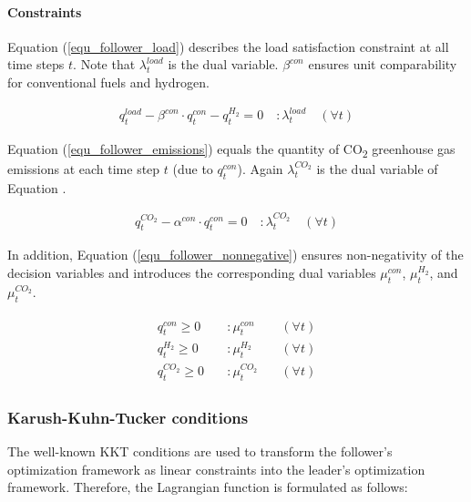 \documentclass[review]{elsarticle}
\begin{document}
\paragraph{Constraints} Equation (\ref{equ_follower_load}) describes the load satisfaction constraint at all time steps $t$. Note that $\lambda_{t}^{load}$ is the dual variable. $\beta^{con}$ ensures unit comparability for conventional fuels and hydrogen.

\begin{align}\label{equ_follower_load}
q_{t}^{load} - \beta^{con} \cdot q_{t}^{con} - q_{t}^{H_2} = 0 \quad :\lambda_{t}^{load} \quad (\forall t)
\end{align}

Equation (\ref{equ_follower_emissions}) equals the quantity of CO\textsubscript{2} greenhouse gas emissions at each time step $t$ (due to $q_{t}^{con}$). Again $\lambda_{t}^{CO_2}$ is the dual variable of Equation .

\begin{align}\label{equ_follower_emissions}
q_{t}^{CO_2} - \alpha^{con} \cdot q_{t}^{con} = 0 \quad :\lambda_{t}^{CO_2} \quad (\forall t)
\end{align}

In addition, Equation (\ref{equ_follower_nonnegative}) ensures non-negativity of the decision variables and introduces the corresponding dual variables $\mu_t^{con}$, $\mu_t^{H_2}$, and $\mu_t^{CO_2}$.

\begin{align}\label{equ_follower_nonnegative}
\begin{aligned}
q_{t}^{con} \geq 0 & \quad:\mu_t^{con} & \quad(\forall t)\\
q_{t}^{H_2} \geq 0 & \quad:\mu_t^{H_2} & \quad(\forall t)\\
q_{t}^{CO_2} \geq 0 & \quad:\mu_t^{CO_2} & \quad(\forall t)
\end{aligned}
\end{align}

\subsubsection{Karush-Kuhn-Tucker conditions}
The well-known KKT conditions are used to transform the follower's optimization framework as linear constraints into the leader's optimization framework. Therefore, the Lagrangian function is formulated as follows:
\end{document}

